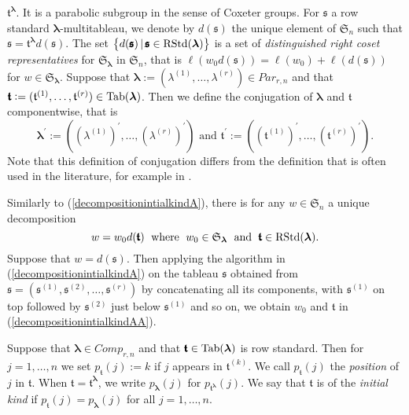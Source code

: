 \documentclass[10pt,a4,twoside,hidelinks,rm]{article}
\newcommand{\s}{\mathfrak{s}}
\newcommand{\T}{\mathfrak{t}}
\newcommand{\bT}{\pmb{\mathfrak{t}}}
\newcommand{\Bs}{\pmb{\mathfrak{s}}}
\newcommand{\MP}{{ {Par}}_{r,n}}
\newcommand{\MC}{{ {Comp}}_{r,n}}
\newcommand{\Si}{\mathfrak{S}}
\newcommand{\rstd}{{\rm RStd}}
\newcommand{\Tab}{{\rm Tab}}
\newcommand\blambda{{\boldsymbol\lambda}}
\theoremstyle{plain}
\begin{document}
$\bT^{\blambda}$. It is a parabolic subgroup in the sense of Coxeter groups.
For $\Bs$ a row standard $\blambda$-multitableau, we denote by
$d(\Bs)$ the unique element of $\Si_n$ such that
$\Bs=\bT^{\blambda}d(\Bs)$. 
The set 
$  \left\{d(\Bs) \, | \,  \Bs  \in \rstd(\blambda) \right\}
$ 
is a set of \textit{distinguished right coset representatives} for $\Si_{\blambda}$ in $ \Si_n$,  that is
$\ell(w_0d(\Bs))=\ell(w_0)+\ell(d(\Bs))$
for $w\in\Si_{\blambda}$.
Suppose that 
$ \blambda:= (\lambda^{(1)}, \ldots, \lambda^{(r)}) \in \MP$
and that $ \bT:= (\T^{(1)}, \ldots, \T^{(r)}) \in \Tab(\blambda)$. Then we define
the conjugation of $ \blambda $ and $ \bT $ componentwise, that is 
\begin{equation}
 \blambda^\prime:= ((\lambda^{(1)})^{\prime}, \ldots, (\lambda^{(r)})^{\prime}) \mbox{ and } 
 \bT^\prime:= ((\T^{(1)})^{\prime}, \ldots, (\T^{(r)})^{\prime}).
\end{equation}
    {\color{black}Note that this definition of conjugation differs from the definition that
      is often used in the literature, for example in \cite{HuMat}}.


Similarly to (\ref{decompositionintialkindA}), there is for any $ w \in \Si_n $ a unique decomposition
\begin{equation}\label{decompositionintialkindAA}
  w = w_0 d(\bT)\; \mbox{ where }\; w_0
  \in \Si_{  \blambda }\;\mbox{ and }\;  \bT  \in  \rstd(\blambda).
\end{equation}
Suppose that $ w= d(\Bs) $. Then 
applying the algorithm in (\ref{decompositionintialkindA})
on the tableau $ \s$ obtained from $ \Bs= (\s^{(1)}, \s^{(2)}, \ldots, \s^{(r)})$ by concatenating all its
components, with $\s^{(1)} $ on top followed by $  \s^{(2)} $ just below $\s^{(1)} $ and so on, 
we obtain $ w_0 $ and $ \bT $ in (\ref{decompositionintialkindAA}).





Suppose that $\blambda \in \MC$ and that $\bT \in \Tab(\blambda)$ is row standard.
Then for $j=1,\ldots,n$ we set 
$p_{\bT}(j):=k$ if $j$ appears in 
$\T^{(k)}$. We call $p_{\bT}(j) $ the
\textit{position} of $j$ in $\bT$.
When $\bT=\bT^{\blambda}$, we write $p_{\blambda}(j)$ for
$p_{\bT^{\blambda}}(j)$. We 
say that $\bT$ is of the
\textit{initial kind} if
$p_{\bT}(j)=p_{\blambda}(j)$ for all $j=1,\ldots,n$.
\end{document}
